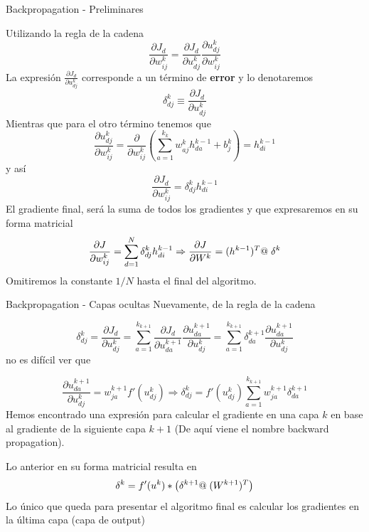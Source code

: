 \documentclass[9pt]{beamer}
\begin{document}
\begin{frame}{Backpropagation - Preliminares}

Utilizando la regla de la cadena 
\[
\frac{\partial J_d}{\partial w_{ij}^k} = \frac{\partial J_d}{\partial u_{dj}^k}\frac{\partial u_{dj}^k}{\partial w_{ij}^k}
\] \pause
La expresión $\frac{\partial J_d}{\partial u_{dj}^k}$ corresponde a un término de \textbf{error} y lo denotaremos \
\[
\delta_{dj}^k \equiv \frac{\partial J_d}{\partial u_{dj}^k}
\] \pause
Mientras que para el otro término tenemos que 
\[
\frac{\partial u_{dj}^k}{\partial w_{ij}^k} = \frac{\partial}{\partial w_{ij}^k} \left ( \sum_{a = 1}^{k_k}w_{aj}^kh_{da}^{k-1} + b_j^k \right) = h_{di}^{k-1}
\] \pause
y así 
\[
\frac{\partial J_d}{\partial w_{ij}^k} = \delta_{dj}^k  h_{di}^{k-1}
\] \pause
El gradiente final, será la suma de todos los gradientes y que expresaremos en su forma matricial
\[\frac{\partial J}{\partial w_{ij}^k} = \sum_{d=1}^N \delta_{dj}^k  h_{di}^{k-1}  \Rightarrow  \frac{\partial J}{\partial W^k} = (h^{k-1})^T @ \hspace{0.1cm} \delta^{k} 
\]
Omitiremos la constante $1/N$ hasta el final del algoritmo.
\end{frame}
\begin{frame}{Backpropagation - Capas ocultas}
Nuevamente, de la regla de la cadena \pause

\[
\delta_{dj}^k = \frac{\partial J_d}{\partial u_{dj}^k} = \sum_{a=1}^{k_{k+1}} \frac{\partial J_d}{\partial u_{da}^{k+1}} \frac{\partial u_{da}^{k+1}}{\partial u_{dj}^k} = \sum_{a=1}^{k_{k+1}} \delta_{da}^{k+1} \frac{\partial u_{da}^{k+1}}{\partial u_{dj}^k} 
\] \pause 
no es difícil ver que

\[
\frac{\partial u_{da}^{k+1}}{\partial u_{dj}^k} = w_{ja}^{k+1}f'(u_{dj}^k)  \Rightarrow  \delta_{dj}^k = f'(u_{dj}^k)\sum_{a=1}^{k_{k+1}}w_{ja}^{k+1}\delta_{da}^{k+1}
\]
\pause
Hemos encontrado una expresión para calcular el gradiente en una capa $k$ en base al gradiente de la siguiente capa $k+1$ (De aquí viene el nombre backward propagation).
\newline \pause

Lo anterior en su forma matricial resulta en 
\[
\delta^{k} = f'(u^k) * \left ( \delta^{k+1} @ \hspace{0.1cm} (W^{k+1})^T \right )
\] \pause
Lo único que queda para presentar el algoritmo final es calcular los gradientes en la última capa (capa de output)

\end{frame}
\end{document}
